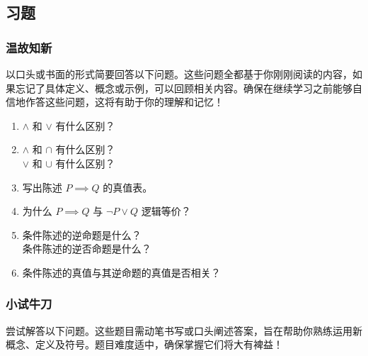 \subsection{习题}

\subsubsection*{温故知新}

以口头或书面的形式简要回答以下问题。这些问题全都基于你刚刚阅读的内容，如果忘记了具体定义、概念或示例，可以回顾相关内容。确保在继续学习之前能够自信地作答这些问题，这将有助于你的理解和记忆！

\begin{enumerate}[label=(\arabic*)]
    \item $\land$ 和 $\lor$ 有什么区别？
    \item $\land$ 和 $\cap$ 有什么区别？\\
          $\lor$ 和 $\cup$ 有什么区别？
    \item 写出陈述 $P \implies Q$ 的真值表。
    \item 为什么 $P \implies Q$ 与 $\neg P \lor Q$ 逻辑等价？
    \item 条件陈述的逆命题是什么？\\
          条件陈述的逆否命题是什么？
    \item 条件陈述的真值与其逆命题的真值是否相关？
\end{enumerate}

\subsubsection*{小试牛刀}

尝试解答以下问题。这些题目需动笔书写或口头阐述答案，旨在帮助你熟练运用新概念、定义及符号。题目难度适中，确保掌握它们将大有裨益！

